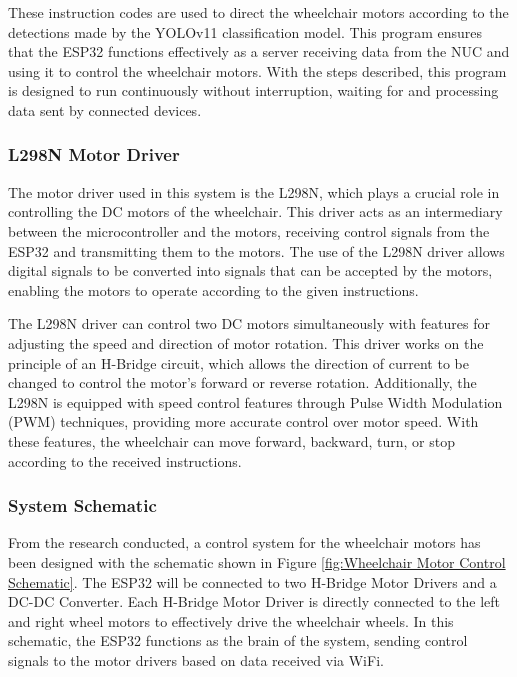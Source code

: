 These instruction codes are used to direct the wheelchair motors according to the detections made by the YOLOv11 classification model. This program ensures that the ESP32 functions effectively as a server receiving data from the NUC and using it to control the wheelchair motors. With the steps described, this program is designed to run continuously without interruption, waiting for and processing data sent by connected devices.

\vspace{5pt}
\subsubsection{L298N Motor Driver}
\label{subsubsec:drivermotor}

The motor driver used in this system is the L298N, which plays a crucial role in controlling the DC motors of the wheelchair. This driver acts as an intermediary between the microcontroller and the motors, receiving control signals from the ESP32 and transmitting them to the motors. The use of the L298N driver allows digital signals to be converted into signals that can be accepted by the motors, enabling the motors to operate according to the given instructions.

The L298N driver can control two DC motors simultaneously with features for adjusting the speed and direction of motor rotation. This driver works on the principle of an H-Bridge circuit, which allows the direction of current to be changed to control the motor's forward or reverse rotation. Additionally, the L298N is equipped with speed control features through Pulse Width Modulation (PWM) techniques, providing more accurate control over motor speed. With these features, the wheelchair can move forward, backward, turn, or stop according to the received instructions.

\vspace{5pt}
\subsubsection{System Schematic}
\label{subsubsec:systemschematic}

From the research conducted, a control system for the wheelchair motors has been designed with the schematic shown in Figure \ref{fig:Wheelchair Motor Control Schematic}. The ESP32 will be connected to two H-Bridge Motor Drivers and a DC-DC Converter. Each H-Bridge Motor Driver is directly connected to the left and right wheel motors to effectively drive the wheelchair wheels. In this schematic, the ESP32 functions as the brain of the system, sending control signals to the motor drivers based on data received via WiFi. \cite{ekatama2024perancangan}


